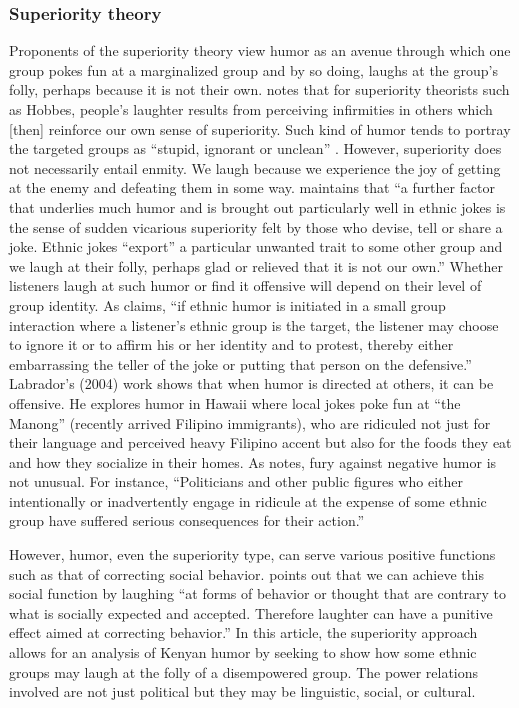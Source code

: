 \documentclass[output=paper]{langsci/langscibook}
\begin{document}
\subsubsection{Superiority theory}

Proponents of the superiority theory view humor as an avenue through which one group pokes fun at a marginalized group and by so doing, laughs at the group’s folly, perhaps because it is not their own. \citet[8]{Carroll2014} notes that for superiority theorists such as Hobbes, people’s laughter results from perceiving infirmities in others which [then] reinforce our own sense of superiority. Such kind of humor tends to portray the targeted groups as “stupid, ignorant or unclean” \citep[115]{Apte1985}. However, superiority does not necessarily entail enmity. We laugh because we experience the joy of getting at the enemy and defeating them in some way. \citet[7]{Davies1990} maintains that “a further factor that underlies much humor and is brought out particularly well in ethnic jokes is the sense of sudden vicarious superiority felt by those who devise, tell or share a joke. Ethnic jokes “export” a particular unwanted trait to some other group and we laugh at their folly, perhaps glad or relieved that it is not our own.” Whether listeners laugh at such humor or find it offensive will depend on their level of group identity. As \citet[34]{Apte1987} claims, “if ethnic humor is initiated in a small group interaction where a listener’s ethnic group is the target, the listener may choose to ignore it or to affirm his or her identity and to protest, thereby either embarrassing the teller of the joke or putting that person on the defensive.” Labrador’s (2004) work shows that when humor is directed at others, it can be offensive. He explores humor in Hawaii where local jokes poke fun at “the Manong” (recently arrived Filipino immigrants), who are ridiculed not just for their language and perceived heavy Filipino accent but also for the foods they eat and how they socialize in their homes. As \citet[35]{Apte1987} notes, fury against negative humor is not unusual. For instance, “Politicians and other public figures who either intentionally or inadvertently engage in ridicule at the expense of some ethnic group have suffered serious consequences for their action.”

However, humor, even the superiority type, can serve various positive functions such as that of correcting social behavior. \citet[x]{Ziv1988} points out that we can achieve this social function by laughing “at forms of behavior or thought that are contrary to what is socially expected and accepted. Therefore laughter can have a punitive effect aimed at correcting behavior.” In this article, the superiority approach allows for an analysis of Kenyan humor by seeking to show how some ethnic groups may laugh at the folly of a disempowered group. The power relations involved are not just political but they may be linguistic, social, or cultural. 
\end{document}
